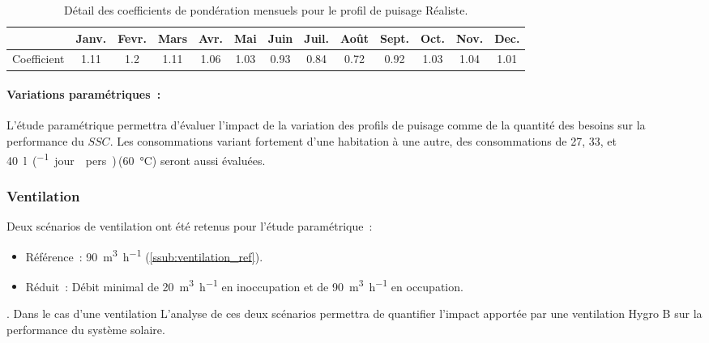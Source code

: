\begin{table}
\centering
\begin{tabular}{l*{12}{c}}
    \toprule
                & Janv. & Fevr. & Mars & Avr. & Mai & Juin & Juil. & Août & Sept. & Oct. & Nov. & Dec. \\
    \midrule
    Coefficient & \num{1.11}   & \num{1.2}   & \num{1.11}  & \num{1.06}  & \num{1.03}  & \num{0.93}   & \num{0.84}    & \num{0.72}   & \num{0.92}    & \num{1.03}  & \num{1.04}  & \num{1.01}  \\
    \bottomrule
\end{tabular}
\caption{Détail des coefficients de pondération mensuels pour le profil de
         puisage Réaliste.}
         \label{tab:coef_mois}
\end{table}

\paragraph{Variations paramétriques~:} %
\label{par:variations_parametriques}
L’étude paramétrique permettra d’évaluer l’impact de la variation des profils de puisage
comme de la quantité des besoins sur la performance du $SSC$. Les consommations variant
fortement d’une habitation à une autre, des consommations de 27, 33, et
\SI{40}{\litre\per(jour \period  pers)}\,(\SI{60}{\celsius}) seront aussi évaluées.


\subsubsection{Ventilation} %
\label{ssub:ventilation}
Deux scénarios de ventilation ont été retenus pour l’étude paramétrique~:
\begin{itemize}
    \item Référence~: \SI[per-mode=symbol]{90}{\meter\cubed\per\hour} (\ref{ssub:ventilation_ref}).
    \item Réduit~: Débit minimal de \SI[per-mode=symbol]{20}{\meter\cubed\per\hour} en inoccupation et de
          \SI[per-mode=symbol]{90}{\meter\cubed\per\hour} en occupation.
\end{itemize}.
Dans le cas d’une ventilation L’analyse de ces deux scénarios permettra de quantifier
l’impact apportée par une ventilation Hygro B sur la performance du système solaire.


